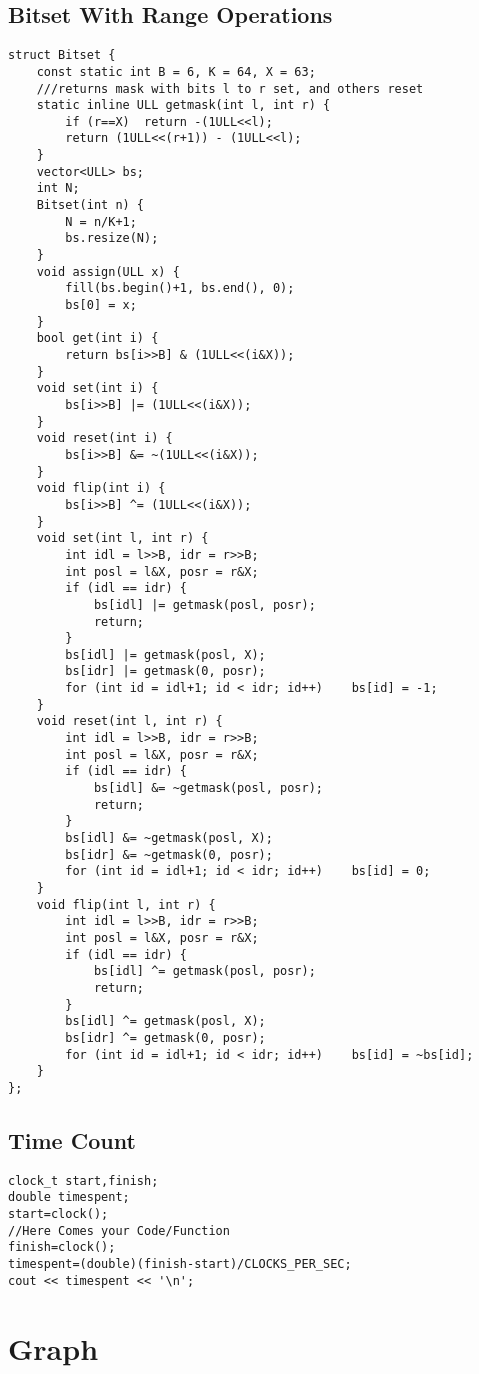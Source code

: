 \documentclass[10pt,a4paper,onesided]{article}
\begin{document}
\begin{multicols*}{3}
\subsection{Bitset With Range Operations}
\begin{lstlisting}
struct Bitset {
    const static int B = 6, K = 64, X = 63;
    ///returns mask with bits l to r set, and others reset
    static inline ULL getmask(int l, int r) {
        if (r==X)  return -(1ULL<<l);
        return (1ULL<<(r+1)) - (1ULL<<l);
    }
    vector<ULL> bs;
    int N;
    Bitset(int n) {
        N = n/K+1;
        bs.resize(N);
    }
    void assign(ULL x) {
        fill(bs.begin()+1, bs.end(), 0);
        bs[0] = x;
    }
    bool get(int i) {
        return bs[i>>B] & (1ULL<<(i&X));
    }
    void set(int i) {
        bs[i>>B] |= (1ULL<<(i&X));
    }
    void reset(int i) {
        bs[i>>B] &= ~(1ULL<<(i&X));
    }
    void flip(int i) {
        bs[i>>B] ^= (1ULL<<(i&X));
    }
    void set(int l, int r) {
        int idl = l>>B, idr = r>>B;
        int posl = l&X, posr = r&X;
        if (idl == idr) {
            bs[idl] |= getmask(posl, posr);
            return;
        }
        bs[idl] |= getmask(posl, X);
        bs[idr] |= getmask(0, posr);
        for (int id = idl+1; id < idr; id++)    bs[id] = -1;
    }
    void reset(int l, int r) {
        int idl = l>>B, idr = r>>B;
        int posl = l&X, posr = r&X;
        if (idl == idr) {
            bs[idl] &= ~getmask(posl, posr);
            return;
        }
        bs[idl] &= ~getmask(posl, X);
        bs[idr] &= ~getmask(0, posr);
        for (int id = idl+1; id < idr; id++)    bs[id] = 0;
    }
    void flip(int l, int r) {
        int idl = l>>B, idr = r>>B;
        int posl = l&X, posr = r&X;
        if (idl == idr) {
            bs[idl] ^= getmask(posl, posr);
            return;
        }
        bs[idl] ^= getmask(posl, X);
        bs[idr] ^= getmask(0, posr);
        for (int id = idl+1; id < idr; id++)    bs[id] = ~bs[id];
    }
};

\end{lstlisting}
\subsection{Time Count}
\begin{lstlisting}
clock_t start,finish;
double timespent;
start=clock();
//Here Comes your Code/Function
finish=clock();
timespent=(double)(finish-start)/CLOCKS_PER_SEC;
cout << timespent << '\n';
\end{lstlisting}
\section{Graph}

\end{multicols*}
\end{document}
